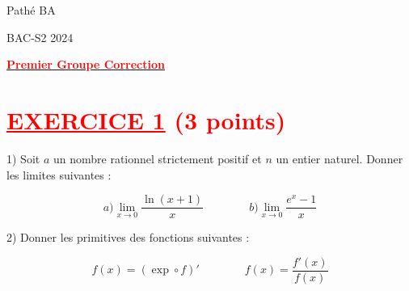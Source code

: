 \documentclass[12pt]{article}
\begin{document}
\begin{minipage}{0.8\textwidth}
	Pathé BA                          
\end{minipage}
\begin{minipage}{0.8\textwidth}
	BAC-S2 2024
\end{minipage}

\begin{center}
\textbf{{\underline{\textcolor{red}{Premier Groupe Correction}}}}
\end{center}





\section*{\textcolor{red}{\underline{EXERCICE 1} (3 points) }}
1) Soit \(a\) un nombre rationnel strictement positif et \(n\) un entier naturel. Donner les limites suivantes :

     \[a) \lim_{x \to 0} \frac{\ln(x+1)}{x}\quad\quad\quad\quad b) \lim_{x \to 0} \frac{e^x - 1}{x} \]


2) Donner les primitives des fonctions suivantes :

    \[ f(x) = ( \exp \circ f)' \quad\quad\quad\quad f(x) = \frac{f'(x)}{f(x)} \]

\end{document}
